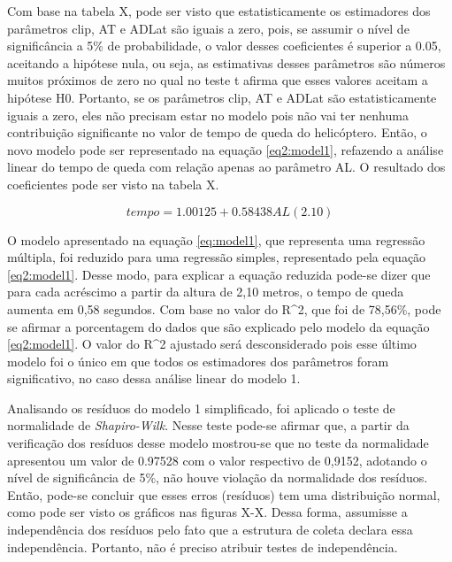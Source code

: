 Com base na tabela X, pode ser visto que estatisticamente os estimadores dos parâmetros clip, AT e ADLat são iguais a zero, pois, se assumir o nível de significância a 5\% de probabilidade, o \rho valor desses coeficientes é superior a 0.05, aceitando a hipótese nula, ou seja, as estimativas desses parâmetros são números muitos próximos de zero no qual no teste t afirma que esses valores aceitam a hipótese H0. Portanto, se os parâmetros clip, AT e ADLat são estatisticamente iguais a zero, eles não precisam estar no modelo pois não vai ter nenhuma contribuição significante no valor de tempo de queda do helicóptero. Então, o novo modelo pode ser representado na equação \ref{eq2:model1}, refazendo a análise linear do tempo de queda com relação apenas ao parâmetro AL. O resultado dos coeficientes pode ser visto na tabela X.  


\begin{equation}
    tempo = 1.00125 + 0.58438AL(2.10)
    \label{eq2:model1}
\end{equation}

O modelo apresentado na equação \ref{eq:model1}, que representa uma regressão múltipla, foi reduzido para uma regressão simples, representado pela equação \ref{eq2:model1}. Desse modo, para explicar a equação reduzida pode-se dizer que para cada acréscimo a partir da altura de 2,10 metros, o tempo de queda aumenta em 0,58 segundos. Com base no valor do R^2, que foi de 78,56\%, pode se afirmar a porcentagem do dados que são explicado pelo modelo da equação \ref{eq2:model1}. O valor do R^2 ajustado será desconsiderado pois esse último modelo foi o único em que todos os estimadores dos parâmetros foram significativo, no caso dessa análise linear do modelo 1. 

Analisando os resíduos do modelo 1 simplificado, foi aplicado o teste de normalidade de \textit{Shapiro-Wilk}. Nesse teste pode-se afirmar que, a partir da verificação dos resíduos desse modelo mostrou-se que no teste da normalidade apresentou um valor de 0.97528 com o \rho valor respectivo de 0,9152, adotando o nível de significância de 5\%, não houve violação da normalidade dos resíduos. Então, pode-se concluir que esses erros (resíduos) tem uma distribuição normal, como pode ser visto os gráficos nas figuras X-X. Dessa forma, assumisse a independência dos resíduos pelo fato que a estrutura de coleta declara essa independência. Portanto, não é preciso atribuir testes de independência.

